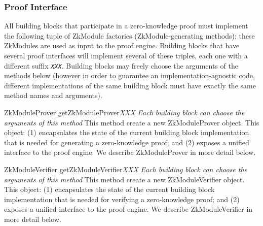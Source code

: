     \subsubsection{Proof Interface}
    \label{sec:intf:proof}
    All building blocks that participate in a zero-knowledge proof must implement the following
    tuple of ZkModule factories (ZkModule-generating methods); these ZkModules are used as input
    to the proof engine.
    Building blocks that have several proof interfaces will
    implement several of these triples, each one with a different suffix \texttt{\emph{XXX}}.
    Building blocks may freely choose the arguments of the methods below (however in order to
    guarantee an implementation-agnostic code, different implementations
    of the same building block must have exactly the same method names and arguments).
      \begin{method}
      {ZkModuleProver}
      {getZkModuleProver\emph{XXX}}
      {
        {\textrm{\textit{Each building block can choose the arguments of this method}}}
      }
      This method create a new ZkModuleProver object. This object: (1) encapsulates the state of the current
      building block implementation that is needed for
      generating a zero-knowledge proof; and (2) exposes a unified interface to the proof engine.
      We describe ZkModuleProver in more detail below.
      \end{method}
      \begin{method}
      {ZkModuleVerifier}
      {getZkModuleVerifier\emph{XXX}}
      {
        {\textrm{\textit{Each building block can choose the arguments of this method}}}
      }
      This method create a new ZkModuleVerifier object. This object: (1) encapsulates the state of the current
      building block implementation that is needed for
      verifying a zero-knowledge proof; and (2) exposes a unified interface to the proof engine.
      We describe ZkModuleVerifier in more detail below.
      \end{method}


